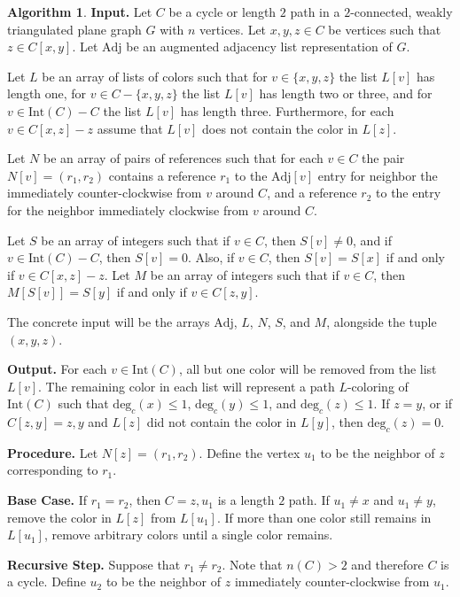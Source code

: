 \documentclass[12pt,letterpaper]{article}
\theoremstyle{plain}
\theoremstyle{definition}
\theoremstyle{break}
\newtheorem{algorithm}[lemma]{Algorithm}     %
\begin{document}
\begin{algorithm}\label{A:hartman_impl}
\textbf{Input.} Let $C$ be a cycle or length $2$ path in a
$2$-connected, weakly triangulated plane graph $G$ with $n$ vertices.
Let $x,y,z\in C$ be vertices such that $z\in C[x,y]$.
Let $\text{Adj}$ be an augmented adjacency list representation of $G$.

Let $L$ be an array of lists of colors
such that for $v\in\{x,y,z\}$ the list $L[v]$ has length one,
for $v\in C-\{x,y,z\}$ the list $L[v]$ has length two
or three, and for $v\in \text{Int}(C)-C$ the list
$L[v]$ has length three. Furthermore, for each $v\in C[x,z] - z$ assume
that $L[v]$ does not contain the color in $L[z]$.

Let $N$ be an array of pairs of
references such that for each $v\in C$ the pair $N[v]=(r_1,r_2)$ contains
a reference $r_1$ to the $\text{Adj}[v]$ entry for neighbor the
immediately counter-clockwise
from $v$
around $C$, and a reference $r_2$
to the entry for the neighbor immediately clockwise from $v$ around $C$.

Let $S$ be an array of
integers such that if $v\in C$, then $S[v]\ne 0$, and if
$v\in \text{Int}(C)-C$, then $S[v]=0$. Also, if
$v\in C$, then $S[v]=S[x]$ if and only if $v\in C[x,z]-z$. Let $M$
be an array of integers such that if $v\in C$, then $M[S[v]]=S[y]$
if and only if $v\in C[z,y]$.

The concrete input will be the arrays $\text{Adj}$, $L$,
$N$, $S$, and $M$, alongside the tuple $(x,y,z)$.

\textbf{Output.} For each $v\in\text{Int}(C)$, all but one color will be
removed from the list $L[v]$. The remaining color in each list will represent
a path $L$-coloring of $\text{Int}(C)$
such that $\text{deg}_c(x)\le1$, $\text{deg}_c(y)\le1$, and
$\text{deg}_c(z)\le1$. If $z=y$, or if $C[z,y]=z,y$ and $L[z]$ did
not contain the color in $L[y]$, then $\text{deg}_c(z)=0$.

\textbf{Procedure.} Let $N[z]=(r_1,r_2)$. Define the vertex $u_1$ to be
the neighbor of $z$ corresponding to $r_1$.

\textbf{Base Case.} If $r_1=r_2$, then $C=z,u_1$
is a length $2$ path. If $u_1\ne x$ and $u_1\ne y$, remove the
color in $L[z]$ from $L[u_1]$. If more than one color still remains in
$L[u_1]$, remove arbitrary colors until a single color remains.

\textbf{Recursive Step.} Suppose that $r_1\ne r_2$. Note that
$n(C)>2$ and therefore $C$ is a cycle. Define $u_2$ to be the
neighbor of $z$ immediately counter-clockwise from $u_1$.


\end{algorithm}
\end{document}
